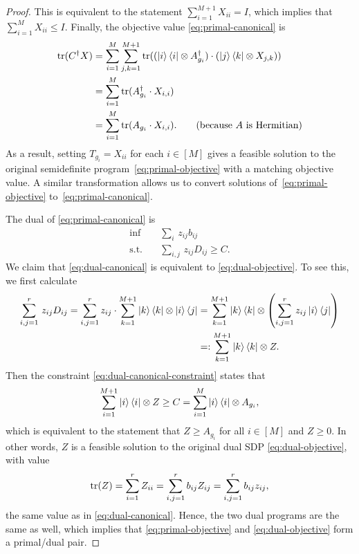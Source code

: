 \begin{proof}
This is equivalent to the statement $\sum_{i=1}^{M+1} X_{i i} = I$, which implies that $\sum_{i=1}^M X_{i i} \leq I$.
Finally, the objective value \eqref{eq:primal-canonical} is
\begin{align*}
\mathrm{tr}(C^\dagger X)
& = \sum_{i = 1}^M  \sum_{j,k = 1}^{M+1} \mathrm{tr}((\ket{i}\bra{i} \otimes A_{g_i}^\dagger) \cdot (\ket{j}\bra{k} \otimes X_{j, k}))\\
&=  \sum_{i = 1}^M \mathrm{tr}(A_{g_i}^\dagger \cdot  X_{i, i})\\
&=  \sum_{i = 1}^M \mathrm{tr}(A_{g_i} \cdot  X_{i, i}). \tag{because~$A$ is Hermitian}
\end{align*}
As a result, setting $T_{g_i} = X_{i i}$ for each $i \in [M]$ gives a feasible solution to the original semidefinite program~\eqref{eq:primal-objective}
with a matching objective value. A similar transformation allows us to convert solutions of~\eqref{eq:primal-objective} to~\eqref{eq:primal-canonical}.

The dual of \eqref{eq:primal-canonical} is 
\begin{align}
\inf &\quad \sum_i\, z_{ij} b_{ij} \label{eq:dual-canonical}\\
  \text{s.t.} &\quad  \sum_{i,j} \,z_{ij} D_{ij} \geq C.\label{eq:dual-canonical-constraint}
\end{align}
We claim that \eqref{eq:dual-canonical} is equivalent to \eqref{eq:dual-objective}.
To see this, we first calculate
\begin{align*}
\sum_{i,j=1}^r \,z_{ij} D_{ij}
= \sum_{i,j=1}^r z_{ij} \cdot \sum_{k=1}^{M+1} \ket{k}\bra{k} \otimes \ket{i}\bra{j}
&= \sum_{k=1}^{M+1} \ket{k}\bra{k} \otimes \left(\sum_{i, j=1}^r z_{ij}\ket{i}\bra{j}\right)\\
&=: \sum_{k=1}^{M+1}\ket{k}\bra{k} \otimes Z.
\end{align*}
Then the constraint \eqref{eq:dual-canonical-constraint} states that
\begin{equation*}
\sum_{i=1}^{M+1}\ket{i}\bra{i} \otimes Z \geq C = \sum_{i = 1}^M \ket{i}\bra{i} \otimes A_{g_i},
\end{equation*}
which is equivalent to the statement that $Z \geq A_{g_i}$ for all $i \in [M]$ and $Z \geq 0$.
In other words, $Z$ is a feasible solution to the original dual SDP \eqref{eq:dual-objective}, with value
\begin{equation*}
\mathrm{tr}(Z) = \sum_{i=1}^r Z_{i i} = \sum_{i,j=1}^r b_{i j} Z_{i j} =  \sum_{i,j=1}^r b_{i j} z_{i j},
\end{equation*}
the same value as in \eqref{eq:dual-canonical}.
Hence, the two dual programs are the same as well,
which implies that \eqref{eq:primal-objective} and \eqref{eq:dual-objective} form a primal/dual pair.


\end{proof}
